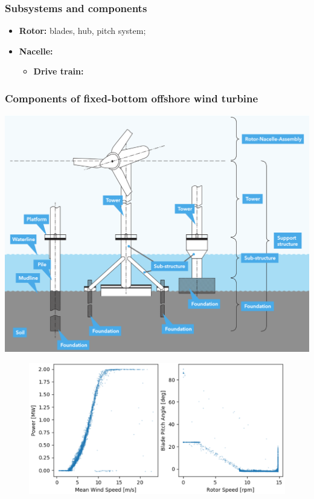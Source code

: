 \documentclass{article}
\begin{document}
\subsubsection{Subsystems and components}
\begin{itemize}
    \item \textbf{Rotor:} blades, hub, pitch system;
    \item \textbf{Nacelle:}
    \begin{itemize}[label=$\circ$]
        \item \textbf{Drive train:}
    \end{itemize}
\end{itemize}

\wrapfill

\newpage
\subsubsection{Components of fixed-bottom offshore wind turbine}
\begin{center}
    \includegraphics[width=.8\textwidth]{media/components.png}
\end{center}

\setlength{\intextsep}{0pt}%
\begin{figure}
    \includegraphics[width=.65\textwidth]{media/basic_operation_modes.png}
    \vspace{-2.7cm}
\end{figure}
\end{document}
